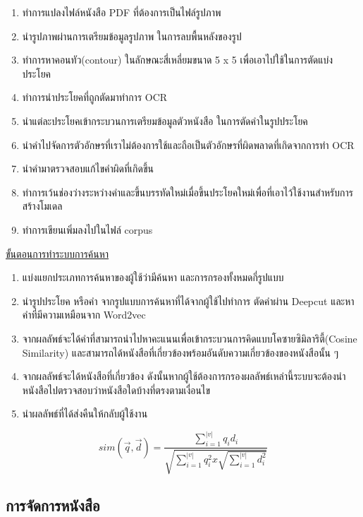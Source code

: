 \begin{enumerate}
    \item ทำการแปลงไฟล์หนังสือ PDF ที่ต้องการเป็นไฟล์รูปภาพ
    \item นำรูปภาพผ่านการเตรียมข้อมูลรูปภาพ ในการลบพื้นหลังของรูป
    \item ทำการหาคอนทัว(contour) ในลักษณะสี่เหลี่ยมขนาด 5 x 5 เพื่อเอาไปใช้ในการตัดแบ่งประโยค
    \item ทำการนำประโยคที่ถูกตัดมาทำการ OCR 
    \item นำแต่ละประโยคเข้ากระบวนการเตรียมข้อมูลตัวหนังสือ ในการตัดคำในรูปประโยค
    \item นำคำไปจัดการตัวอักษรที่เราไม่ต้องการใช้และถือเป็นตัวอักษรที่ผิดพลาดที่เกิดจากการทำ OCR
    \item นำคำมาตรวจสอบแก้ไขคำผิดที่เกิดขึ้น
    \item ทำการเว้นช่องว่างระหว่างคำและขึ้นบรรทัดใหม่เมื่อขึ้นประโยคใหม่เพื่อที่เอาไว้ใช้งานสำหรับการสร้างโมเดล
    \item ทำการเขียนเพิ่มลงไปในไฟล์ corpus 
\end{enumerate}

\underline{ขั้นตอนการทำระบบการค้นหา}

\begin{enumerate}
    \item แบ่งแยกประเภทการค้นหาของผู้ใช้ว่ามีค้นหา และการกรองทั้งหมดกี่รูปแบบ
    \item นำรูปประโยค หรือคำ จากรูปแบบการค้นหาที่ได้จากผู้ใช้ไปทำการ ตัดคำผ่าน Deepcut และหาคำที่มีความเหมือนจาก Word2vec
    \item จากผลลัพธ์จะได้คำที่สามารถนำไปหาคะแนนเพื่อเข้ากระบวนการคิดแบบโคซายซิมิลาริตี้(Cosine Similarity) และสามารถได้หนังสือที่เกี่ยวข้องพร้อมอันดับความเกี่ยวข้องของหนังสือนั้น ๆ
    \item จากผลลัพธ์จะได้หนังสือที่เกี่ยวข้อง ดังนั้นหากผู้ใช้ต้องการกรองผลลัพธ์เหล่านี้ระบบจะต้องนำหนังสือไปตรวจสอบว่าหนังสือใดบ้างที่ตรงตามเงื่อนไข
    \item นำผลลัพธ์ที่ได้ส่งคืนให้กลับผู้ใช้งาน

\end{enumerate}

\begin{equation}
    sim(\vec{q},\vec{d})=\frac{\sum_{i=1}^{|v|}q_{i}d_{i} }{\sqrt{\sum_{i=1}^{|v|}q^{2}_{i}x\sqrt{\sum_{i=1}^{|v|}d^{2}_{i}}}}
    \end{equation}    

\subsection{การจัดการหนังสือ}

